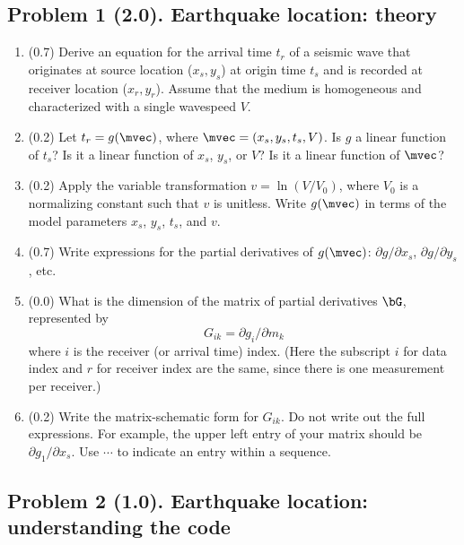 \documentclass[11pt,titlepage,fleqn]{article}
\begin{document}

\subsection*{Problem 1 (2.0). Earthquake location: theory}

\begin{enumerate}
\item (0.7) Derive an equation for the arrival time $t_r$ of a seismic wave that originates at source location ($x_s, y_s$) at origin time $t_s$ and is recorded at receiver location ($x_r, y_r$). Assume that the medium is homogeneous and characterized with a single wavespeed $V$.

\item (0.2) Let $t_r = g(\mvec)$, where $\mvec = (x_s,y_s,t_s,V)$.
Is $g$ a linear function of $t_s$? Is it a linear function of $x_s$, $y_s$, or $V$?
Is it a linear function of $\mvec$?

\item (0.2) Apply the variable transformation $v = \ln(V/V_0)$, where $V_0$ is a normalizing constant such that $v$ is unitless. Write $g(\mvec)$ in terms of the model parameters $x_s$, $y_s$, $t_s$, and $v$.

\item (0.7) Write expressions for the partial derivatives of $g(\mvec)$: $\partial g/ \partial x_s$, $\partial g/ \partial y_s$, etc.

\item (0.0) What is the dimension of the matrix of partial derivatives $\bG$, represented by
%
\begin{equation}
G_{ik} = \partial g_i/ \partial m_k
\end{equation}
%
where $i$ is the receiver (or arrival time) index. (Here the subscript $i$ for data index and $r$ for receiver index are the same, since there is one measurement per receiver.)

\item (0.2) Write the matrix-schematic form for $G_{ik}$. Do not write out the full expressions.
For example, the upper left entry of your matrix should be $\partial g_1/\partial x_s$.
Use $\cdots$ to indicate an entry within a sequence.

\end{enumerate}


\subsection*{Problem 2 (1.0). Earthquake location: understanding the code}
\end{document}
